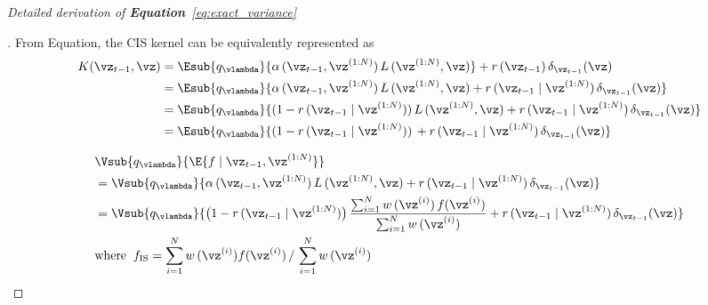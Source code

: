

\textit{Detailed derivation of \textbf{Equation}~\eqref{eq:exact_variance}}
\begin{proof}[\unskip\nopunct]
  From Equation, the CIS kernel can be equivalently represented as
  \begin{align}
    K(\vz_{t-1}, \vz) &= \Esub{q_{\vlambda}}{
      \alpha\,(\vz_{t-1}, \vz^{(1:N)})\, L\,(\vz^{(1:N)}, \vz) } + r\,(\vz_{t-1}) \, \delta_{\vz_{t-1}}(\vz)
     \\
     &= \Esub{q_{\vlambda}}{
      \alpha\,(\vz_{t-1}, \vz^{(1:N)})\, L\,(\vz^{(1:N)}, \vz) + r\,(\vz_{t-1}\mid\vz^{(1:N)}) \, \delta_{\vz_{t-1}}(\vz)
    } \\
    &= \Esub{q_{\vlambda}}{
      (1 - r\,(\vz_{t-1}\mid\vz^{(1:N)}))\, L\,(\vz^{(1:N)}, \vz) + r\,(\vz_{t-1}\mid\vz^{(1:N)}) \, \delta_{\vz_{t-1}}(\vz)
    } \\
    &= \Esub{q_{\vlambda}}{
      (1 - r\,(\vz_{t-1}\mid\vz^{(1:N)}))\,   + r\,(\vz_{t-1}\mid\vz^{(1:N)}) \, \delta_{\vz_{t-1}}(\vz)
    }
  \end{align}
  
  \begin{align}
  &\Vsub{q_{\vlambda}}{ \E{ f \mid \vz_{t-1}, \vz^{(1:N)} } } \\
    &= \Vsub{q_{\vlambda}}{
      \alpha\,(\vz_{t-1}, \vz^{(1:N)})\, L\,(\vz^{(1:N)}, \vz) + r\,(\vz_{t-1}\mid\vz^{(1:N)}) \, \delta_{\vz_{t-1}}(\vz)}\\
    &= \Vsub{q_{\vlambda}}{
      \big(1 - r\,(\vz_{t-1}\mid\vz^{(1:N)}) \big)\, \frac{\sum^{N}_{i=1} w\,(\vz^{(i)})\,f(\vz^{(i)})}{\sum^{N}_{i=1} w\,(\vz^{(i)})} + r\,(\vz_{t-1}\mid\vz^{(1:N)}) \, \delta_{\vz_{t-1}}(\vz)} \\
  &\text{where}\;\; f_{\mathrm{IS}} = {\sum_{i=1}^N w\,(\vz^{(i)}) f(\vz^{(i)})\,/\,\sum_{i=1}^N w\,(\vz^{(i)})} \nonumber 
  \end{align}
\end{proof}

